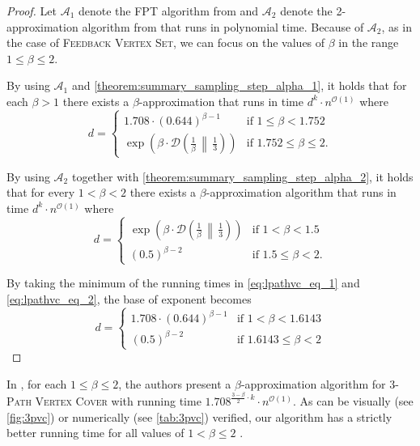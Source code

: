 \documentclass[letterpaper,11pt]{article}
\newcommand{\1}[1]{\mathds{1}\left[#1\right]}
\newcommand{\D}[2]{\mathcal{D}\left(#1\, \middle\|\,#2 \right)}
\newcommand{\Oh}{\mathcal{O}}
\newcommand{\pathvc}[1]{\ensuremath{#1}\textsc{-Path Vertex Cover}\xspace}
\newcommand{\fvs}{\textsc{Feedback Vertex Set}\xspace}
\begin{document}
\begin{proof}
	Let $\mathcal{A}_1$ denote the FPT algorithm from \cite{cervenyGeneratingFasterAlgorithms2023} and $\mathcal{A}_2$ denote the 2-approximation algorithm from \cite{tuFactorApproximationAlgorithm2011}
	that runs in polynomial time. Because of $\mathcal{A}_2$, as in the case of \fvs,
	we can focus on the values of $\beta$ in the range $1 \leq \beta \leq 2$.
	
	
	By using $\mathcal{A}_1$ and \cref{theorem:summary_sampling_step_alpha_1},
	it holds that for each $\beta > 1$ there exists a $\beta$-approximation that runs
	in time $d^{k} \cdot n^{\Oh(1)}$ where
		\begin{equation}\label{eq:lpathvc_eq_1}
			d = \begin{cases}
				1.708 \cdot \left(0.644\right)^{\beta - 1} &\text{if } 1 \leq \beta < 1.752\\
				\exp\left( \beta \cdot \D{\frac{1}{\beta}}{\frac{1}{3}} \right) &\text{if } 1.752 \leq \beta \leq 2.
			\end{cases}
		\end{equation}	
	
	By using $\mathcal{A}_2$ together with \cref{theorem:summary_sampling_step_alpha_2},
	it holds that for every $1 < \beta < 2$ there exists a $\beta$-approximation algorithm
	that runs in time $d^{k} \cdot n^{\Oh(1)}$ where
	\begin{equation}\label{eq:lpathvc_eq_2}
		d = \begin{cases}
			\exp\left( \beta \cdot \D{\frac{1}{\beta}}{\frac{1}{3}} \right) &\text{if } 1 < \beta < 1.5\\
			\left(0.5\right)^{\beta - 2}  &\text{if } 1.5 \leq \beta < 2.
		\end{cases}
	\end{equation}	
	
	By taking the minimum of the running times in \eqref{eq:lpathvc_eq_1} and \eqref{eq:lpathvc_eq_2},
	the base of exponent becomes
	\begin{equation*}
		d = \begin{cases}
			1.708 \cdot \left(0.644\right)^{\beta - 1} &\text{if } 1 < \beta < 1.6143\\
			\left(0.5\right)^{\beta - 2}  &\text{if } 1.6143 \leq \beta < 2
		\end{cases}
	\end{equation*}
\end{proof}

In \cite{Fellows2018}, for each $1 \leq \beta \leq 2$, the authors present a $\beta$-approximation algorithm for \pathvc{3} with running time $1.708^{\frac{3-\beta}{2}\cdot k }\cdot n^{\Oh(1)}$.
As can be visually (see \cref{fig:3pvc}) or numerically (see \cref{tab:3pvc}) verified,
our algorithm has a strictly better running time for all values of $1 < \beta \leq 2$ .
\end{document}
